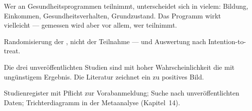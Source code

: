 \begin{aufgabe}
Wer an Gesundheitsprogrammen teilnimmt, unterscheidet sich in vielem: Bildung, Einkommen, Gesundheitsverhalten, Grundzustand. Das Programm wirkt vielleicht --- gemessen wird aber vor allem, wer teilnimmt.

 Randomisierung der , nicht der Teilnahme --- und Auswertung nach Intention-to-treat.

\begin{center}
\begin{minipage}{0.86\textwidth}
\end{minipage}
\end{center}

Die drei unveröffentlichten Studien sind mit hoher Wahrscheinlichkeit die mit ungünstigem Ergebnis. Die Literatur zeichnet ein zu positives Bild.

 Studienregister mit Pflicht zur Vorabanmeldung; Suche nach unveröffentlichten Daten; Trichterdiagramm in der Metaanalyse (Kapitel~14).
\end{aufgabe}


